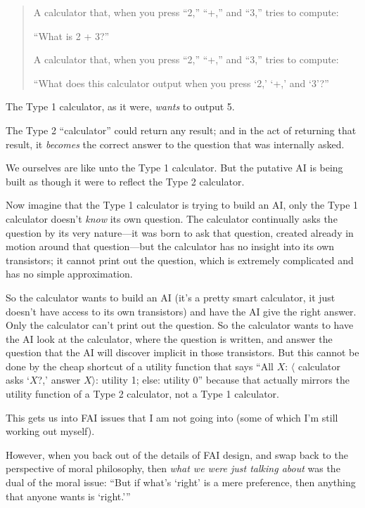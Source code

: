 \begin{quotation}
{
 A calculator that, when you press
``2,''
``+,'' and
``3,'' tries to compute:}

{
 ``What is 2 + 3?''}

{
 A calculator that, when you press
``2,''
``+,'' and
``3,'' tries to compute:}

{
 ``What does this calculator output when you press
`2,' `+,'
and `3'?''}
\end{quotation}

{
 The Type 1 calculator, as it were, \textit{wants} to output 5.}

{
 The Type 2 ``calculator'' could
return any result; and in the act of returning that result, it
\textit{becomes} the correct answer to the question that was internally
asked.}

{
 We ourselves are like unto the Type 1 calculator. But the putative
AI is being built as though it were to reflect the Type 2 calculator.}

{
 Now imagine that the Type 1 calculator is trying to build an AI,
only the Type 1 calculator doesn't \textit{know} its
own question. The calculator continually asks the question by its very
nature---it was born to ask that question, created already in motion
around that question---but the calculator has no insight into its own
transistors; it cannot print out the question, which is extremely
complicated and has no simple approximation.}

{
 So the calculator wants to build an AI (it's a
pretty smart calculator, it just doesn't have access to
its own transistors) and have the AI give the right answer. Only the
calculator can't print out the question. So the
calculator wants to have the AI look at the calculator, where the
question is written, and answer the question that the AI will discover
implicit in those transistors. But this cannot be done by the cheap
shortcut of a utility function that says ``All $X$:
$\langle$ calculator asks
`$X$?,' answer
$X$$\rangle$: utility 1; else: utility
0'' because that actually mirrors the utility
function of a Type 2 calculator, not a Type 1 calculator.}

{
 This gets us into FAI issues that I am not going into (some of
which I'm still working out myself).}

{
 However, when you back out of the details of FAI design, and swap
back to the perspective of moral philosophy, then \textit{what we were
just talking about} was the dual of the moral issue:
``But if what's
`right' is a mere preference, then
anything that anyone wants is
`right.'''}

